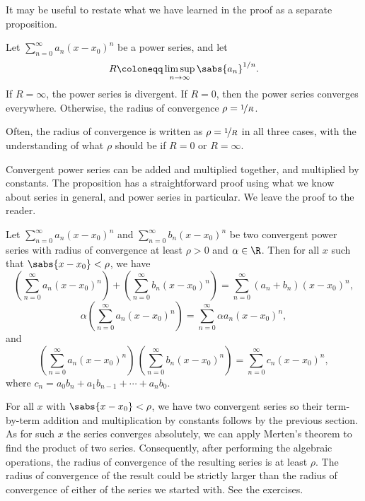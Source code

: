 It may be useful to restate what we have learned in the proof
as a separate proposition.

\begin{prop}
Let $\sum_{n=0}^\infty a_n {(x-x_0)}^n$ be a power series, and let
\begin{equation*}
R \coloneqq \limsup_{n\to\infty} {\sabs{a_n}}^{1/n} .
\end{equation*}
If $R = \infty$, the power series is divergent.  If
$R=0$, then the power series converges everywhere.   Otherwise,
the radius of convergence $\rho = \nicefrac{1}{R}$.
\end{prop}

Often, the radius of convergence is written as $\rho = \nicefrac{1}{R}$ in all
three cases, with
the understanding of what $\rho$ should be if $R = 0$ or $R =
\infty$.

\pagebreak[2]
Convergent power series can be added and multiplied together, and multiplied
by constants.
The proposition has a straightforward proof using what we know about series
in general, and power series in particular.  We leave the proof to the reader.

\begin{prop}
Let $\sum_{n=0}^\infty a_n {(x-x_0)}^n$ and
$\sum_{n=0}^\infty b_n {(x-x_0)}^n$ be two convergent power series
with radius of convergence at least $\rho > 0$ and $\alpha \in \R$.  Then
for all $x$ such that $\sabs{x-x_0} < \rho$, we have 
\begin{equation*}
\left(\sum_{n=0}^\infty a_n {(x-x_0)}^n\right)
+
\left(\sum_{n=0}^\infty b_n {(x-x_0)}^n\right)
=
\sum_{n=0}^\infty (a_n+b_n) {(x-x_0)}^n ,
\end{equation*}
\begin{equation*}
\alpha
\left(\sum_{n=0}^\infty a_n {(x-x_0)}^n\right)
=
\sum_{n=0}^\infty \alpha a_n {(x-x_0)}^n ,
\end{equation*}
and
\begin{equation*}
\left(\sum_{n=0}^\infty a_n {(x-x_0)}^n\right)
\,
\left(\sum_{n=0}^\infty b_n {(x-x_0)}^n\right)
=
\sum_{n=0}^\infty c_n {(x-x_0)}^n ,
\end{equation*}
where
$c_n = a_0b_n + a_1 b_{n-1} + \cdots + a_n b_0$.
\end{prop}

For all $x$ with $\sabs{x-x_0} < \rho$, we have two convergent series so
their term-by-term addition and multiplication by constants
follows by the previous section.
As for such $x$ the series converges absolutely,
we can apply Merten's theorem to find the product of two series.
Consequently, after performing the algebraic operations, the
radius of convergence of the resulting series is at least $\rho$.
The radius of convergence of the result could be strictly larger than
the radius of convergence of either of the series we started with.
See the exercises.

